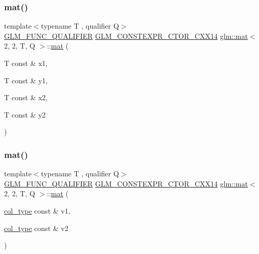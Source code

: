 \mbox{\label{structglm_1_1mat_3_012_00_012_00_01_t_00_01_q_01_4_a05d1ee6449846c51a58f0b2bb0219c42}} 
\subsubsection{\texorpdfstring{mat()}{mat()}\hspace{0.1cm}{\footnotesize\ttfamily [5/21]}}
{\footnotesize\ttfamily template$<$typename T , qualifier Q$>$ \\
\hyperlink{setup_8hpp_a33fdea6f91c5f834105f7415e2a64407}{G\+L\+M\+\_\+\+F\+U\+N\+C\+\_\+\+Q\+U\+A\+L\+I\+F\+I\+ER} \hyperlink{setup_8hpp_a0900f9145e68bf6061b6f5e7be3fa751}{G\+L\+M\+\_\+\+C\+O\+N\+S\+T\+E\+X\+P\+R\+\_\+\+C\+T\+O\+R\+\_\+\+C\+X\+X14} \hyperlink{structglm_1_1mat}{glm\+::mat}$<$ 2, 2, T, Q $>$\+::\hyperlink{structglm_1_1mat}{mat} (\begin{DoxyParamCaption}\item[{T const \&}]{x1,  }\item[{T const \&}]{y1,  }\item[{T const \&}]{x2,  }\item[{T const \&}]{y2 }\end{DoxyParamCaption})}

\mbox{\label{structglm_1_1mat_3_012_00_012_00_01_t_00_01_q_01_4_aad5bc3eb3a2e58e760d65e8c5fa66427}} 
\subsubsection{\texorpdfstring{mat()}{mat()}\hspace{0.1cm}{\footnotesize\ttfamily [6/21]}}
{\footnotesize\ttfamily template$<$typename T , qualifier Q$>$ \\
\hyperlink{setup_8hpp_a33fdea6f91c5f834105f7415e2a64407}{G\+L\+M\+\_\+\+F\+U\+N\+C\+\_\+\+Q\+U\+A\+L\+I\+F\+I\+ER} \hyperlink{setup_8hpp_a0900f9145e68bf6061b6f5e7be3fa751}{G\+L\+M\+\_\+\+C\+O\+N\+S\+T\+E\+X\+P\+R\+\_\+\+C\+T\+O\+R\+\_\+\+C\+X\+X14} \hyperlink{structglm_1_1mat}{glm\+::mat}$<$ 2, 2, T, Q $>$\+::\hyperlink{structglm_1_1mat}{mat} (\begin{DoxyParamCaption}\item[{\hyperlink{structglm_1_1mat_3_012_00_012_00_01_t_00_01_q_01_4_a2983591534ee443dd378cedcbe771749}{col\+\_\+type} const \&}]{v1,  }\item[{\hyperlink{structglm_1_1mat_3_012_00_012_00_01_t_00_01_q_01_4_a2983591534ee443dd378cedcbe771749}{col\+\_\+type} const \&}]{v2 }\end{DoxyParamCaption})}

